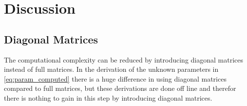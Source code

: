 \chapter{Discussion} %
\label{cha:discussion}

\section{Diagonal Matrices} %
\label{sec:diagonal_matrices}
The computational complexity can be reduced by introducing diagonal matrices instead of full matrices. In the derivation of the unknown parameters in \eqref{eq:param_computed} there is a huge difference in using diagonal matrices compared to full matrices, but these derivations are done off line and therefor there is nothing to gain in this step by introducing diagonal matrices.

% 
% 

